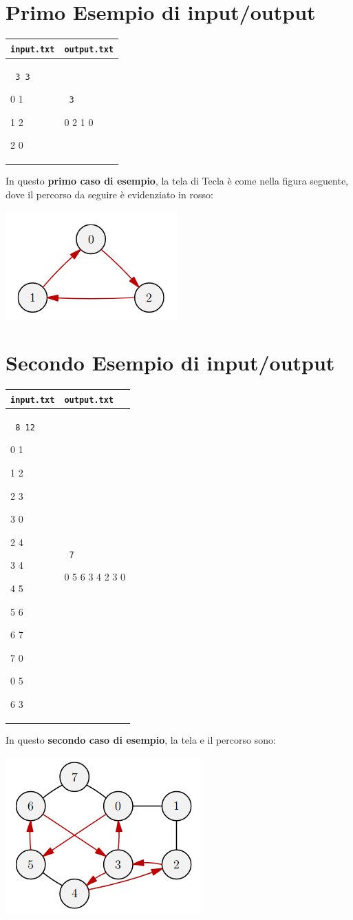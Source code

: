 \documentclass[a4paper,11pt]{article}
\newcommand{\file}[1]{\texttt{#1}}
\newcommand{\esempio}[2]{
\noindent\begin{minipage}{\textwidth}
\begin{tabular}{|p{8cm}|p{8cm}|}
	\hline
      \textbf{\file{input.txt}} & \textbf{\file{output.txt}}\\
	\hline
	\tt \small #1 &
	\tt \small #2 \\
	\hline
\end{tabular}
\end{minipage}
}
\begin{document}
\section*{Primo Esempio di input/output}
\esempio{
3 3

0 1

1 2

2 0
}{
3
  
0 2 1 0
}

In questo \textbf{primo caso di esempio}, la tela di Tecla \`e come nella figura seguente, dove il percorso da seguire \`e evidenziato in rosso:
\begin{center}
	\includegraphics[scale=0.5]{asy_tecla/tecla1.png}
\end{center}



\section*{Secondo Esempio di input/output}
\esempio{
8 12

0 1

1 2

2 3

3 0

2 4

3 4

4 5

5 6

6 7

7 0

0 5

6 3
}{
7
  
0 5 6 3 4 2 3 0
}

In questo \textbf{secondo caso di esempio}, la tela e il percorso sono:
\begin{center}
	\includegraphics[scale=1.7]{asy_tecla/tecla2.png}
\end{center}
\end{document}
